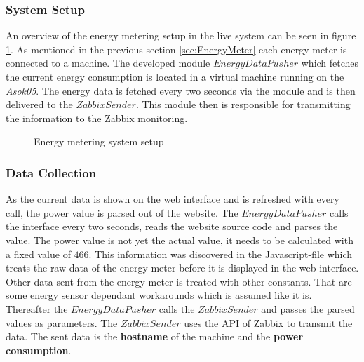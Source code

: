 {\subsubsection{System Setup}
An overview of the energy metering setup in the live system can be seen in figure \ref{fig:energyMeteringSetup}. As mentioned in the previous section \ref{sec:EnergyMeter} each energy meter is connected to a machine. The developed module $ EnergyDataPusher $ which fetches the current energy consumption is located in a virtual machine running on the \textit{Asok05}. The energy data is fetched every two seconds via the module and is then delivered to the $ ZabbixSender $. This module then is responsible for transmitting the information to the Zabbix monitoring.

\begin{figure}
	\centering
	\def\svgwidth{\columnwidth}
	
	\caption{Energy metering system setup}
	\label{fig:energyMeteringSetup}
\end{figure}

\subsubsection{Data Collection}
As the current data is shown on the web interface and is refreshed with every call, the power value is parsed out of the website. The $ EnergyDataPusher $ calls the interface every two seconds, reads the website source code and parses the value. The power value is not yet the actual value, it needs to be calculated with a fixed value of $ 466 $. This information was discovered in the Javascript-file which treats the raw data of the energy meter before it is displayed in the web interface. Other data sent from the energy meter is treated with other constants. That are some energy sensor dependant workarounds which is assumed like it is. Thereafter the $ EnergyDataPusher $ calls the $ ZabbixSender $ and passes the parsed values as parameters. The $ ZabbixSender $ uses the API of Zabbix to transmit the data. The sent data is the \textbf{hostname} of the machine and the \textbf{power consumption}.

}
